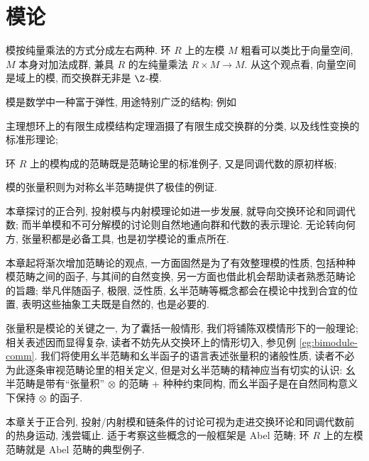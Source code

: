 
\chapter{模论}\label{sec:modules}
模按纯量乘法的方式分成左右两种. 环 $R$ 上的左模 $M$ 粗看可以类比于向量空间, $M$ 本身对加法成群, 兼具 $R$ 的左纯量乘法 $R \times M \to M$. 从这个观点看, 向量空间是域上的模, 而交换群无非是 $\Z$-模.

模是数学中一种富于弹性, 用途特别广泛的结构; 例如
\begin{inparaenum}[(a)]
	\item 主理想环上的有限生成模结构定理涵摄了有限生成交换群的分类, 以及线性变换的标准形理论;
	\item 环 $R$ 上的模构成的范畴既是范畴论里的标准例子, 又是同调代数的原初样板;
	\item 模的张量积则为对称幺半范畴提供了极佳的例证.
\end{inparaenum}
本章探讨的正合列, 投射模与内射模理论如进一步发展, 就导向交换环论和同调代数; 而半单模和不可分解模的讨论则自然地通向群和代数的表示理论. 无论转向何方, 张量积都是必备工具, 也是初学模论的重点所在.

本章起将渐次增加范畴论的观点, 一方面固然是为了有效整理模的性质, 包括种种模范畴之间的函子, 与其间的自然变换, 另一方面也借此机会帮助读者熟悉范畴论的旨趣; 举凡伴随函子, 极限, 泛性质, 幺半范畴等概念都会在模论中找到合宜的位置, 表明这些抽象工夫既是自然的, 也是必要的.

\begin{wenxintishi}
	张量积是模论的关键之一, 为了囊括一般情形, 我们将铺陈双模情形下的一般理论; 相关表述因而显得复杂, 读者不妨先从交换环上的情形切入, 参见例 \ref{eg:bimodule-comm}. 我们将使用幺半范畴和幺半函子的语言表述张量积的诸般性质, 读者不必为此逐条审视范畴论里的相关定义, 但是对幺半范畴的精神应当有切实的认识: 幺半范畴是带有``张量积'' $\otimes$ 的范畴 + 种种约束同构, 而幺半函子是在自然同构意义下保持 $\otimes$ 的函子.
	
	本章关于正合列, 投射/内射模和链条件的讨论可视为走进交换环论和同调代数前的热身运动, 浅尝辄止. 适于考察这些概念的一般框架是 Abel 范畴; 环 $R$ 上的左模范畴就是 Abel 范畴的典型例子.
\end{wenxintishi}

